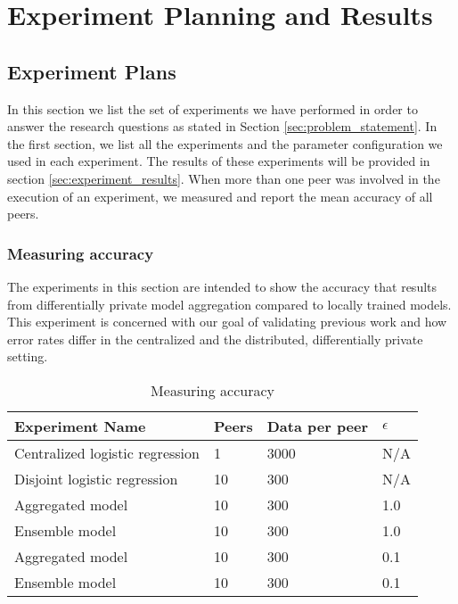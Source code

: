 
\chapter{Experiment Planning and Results}
\label{ch:experiments_and_results}

\section{Experiment Plans}
\label{sec:experiment_plan}

In this section we list the set of experiments we have performed in order to answer the research questions as stated in Section \ref{sec:problem_statement}. In the first section, we list all the experiments and the parameter configuration we used in each experiment. The results of these experiments will be provided in section \ref{sec:experiment_results}. When more than one peer was involved in the execution of an experiment, we measured and report the mean accuracy of all peers.


\subsection{Measuring accuracy}
\label{sec:experiment_measuring_accuracy}
The experiments in this section are intended to show the accuracy that results from differentially private model aggregation compared to locally trained models. This experiment is concerned with our goal of validating previous work and how error rates differ in the centralized and the distributed, differentially private setting.

\begin{table}[h]
	\centering
	\begin{tabular}{|l|l|l|l|}
		{\bf Experiment Name}           & {\bf Peers} & {\bf Data per peer} & {\bf $\epsilon$} \\
		\hline
		Centralized logistic regression & 1           & 3000       & N/A              \\	
		Disjoint logistic regression    & 10          & 300        & N/A              \\
		Aggregated model                & 10          & 300        & 1.0              \\
		Ensemble model                  & 10          & 300        & 1.0              \\
		Aggregated model                & 10          & 300        & 0.1              \\
		Ensemble model  & 10    & 300        & 0.1             
	\end{tabular}
	\caption{Measuring accuracy}
	\label{tab:experiment_accuracy_measuring}
\end{table}

